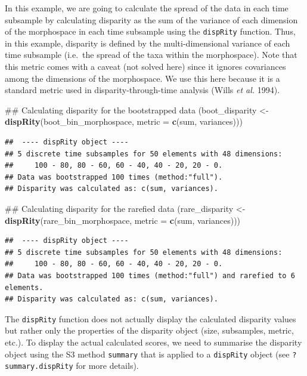 \documentclass[]{book}
\newenvironment{Shaded}{\begin{snugshade}}{\end{snugshade}}
\newcommand{\KeywordTok}[1]{\textcolor[rgb]{0.13,0.29,0.53}{\textbf{#1}}}
\newcommand{\DataTypeTok}[1]{\textcolor[rgb]{0.13,0.29,0.53}{#1}}
\newcommand{\StringTok}[1]{\textcolor[rgb]{0.31,0.60,0.02}{#1}}
\newcommand{\NormalTok}[1]{#1}
\theoremstyle{definition}
\theoremstyle{definition}
\theoremstyle{remark}
\begin{document}
In this example, we are going to calculate the spread of the data in
each time subsample by calculating disparity as the sum of the variance
of each dimension of the morphospace in each time subsample using the
\texttt{dispRity} function. Thus, in this example, disparity is defined
by the multi-dimensional variance of each time subsample (i.e.~the
spread of the taxa within the morphospace). Note that this metric comes
with a caveat (not solved here) since it ignores covariances among the
dimensions of the morphospace. We use this here because it is a standard
metric used in disparity-through-time analysis (Wills \emph{et al.}
1994).

\begin{Shaded}
\begin{Highlighting}[]
\NormalTok{## Calculating disparity for the bootstrapped data}
\NormalTok{(boot_disparity <-}\StringTok{ }\KeywordTok{dispRity}\NormalTok{(boot_bin_morphospace, }\DataTypeTok{metric =} \KeywordTok{c}\NormalTok{(sum, variances)))}
\end{Highlighting}
\end{Shaded}

\begin{verbatim}
##  ---- dispRity object ---- 
## 5 discrete time subsamples for 50 elements with 48 dimensions:
##     100 - 80, 80 - 60, 60 - 40, 40 - 20, 20 - 0.
## Data was bootstrapped 100 times (method:"full").
## Disparity was calculated as: c(sum, variances).
\end{verbatim}

\begin{Shaded}
\begin{Highlighting}[]
\NormalTok{## Calculating disparity for the rarefied data}
\NormalTok{(rare_disparity <-}\StringTok{ }\KeywordTok{dispRity}\NormalTok{(rare_bin_morphospace, }\DataTypeTok{metric =} \KeywordTok{c}\NormalTok{(sum, variances)))}
\end{Highlighting}
\end{Shaded}

\begin{verbatim}
##  ---- dispRity object ---- 
## 5 discrete time subsamples for 50 elements with 48 dimensions:
##     100 - 80, 80 - 60, 60 - 40, 40 - 20, 20 - 0.
## Data was bootstrapped 100 times (method:"full") and rarefied to 6 elements.
## Disparity was calculated as: c(sum, variances).
\end{verbatim}

The \texttt{dispRity} function does not actually display the calculated
disparity values but rather only the properties of the disparity object
(size, subsamples, metric, etc.). To display the actual calculated
scores, we need to summarise the disparity object using the S3 method
\texttt{summary} that is applied to a \texttt{dispRity} object (see
\texttt{?summary.dispRity} for more details).
\end{document}
